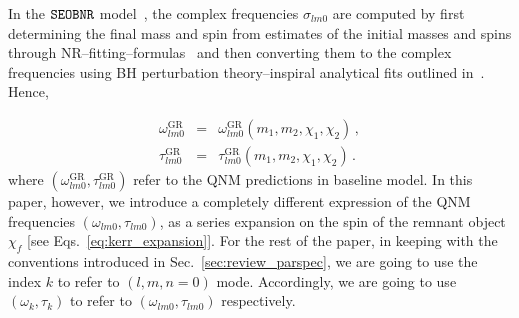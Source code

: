 In the $\texttt{SEOBNR}$ model~\cite{Mihaylov:2021bpf}, the complex frequencies $\sigma_{l m 0}$ are computed by first determining the final mass and spin from estimates of the initial masses and spins through NR--fitting--formulas~\cite{Taracchini:2013rva,Hofmann:2016yih} and then converting them to the complex frequencies using BH perturbation theory--inspiral analytical fits outlined in~\cite{Berti:2005ys,Berti:2009kk}. Hence,

\begin{subequations}
\begin{eqnarray}
\omega_{l m 0}^{\text{GR}} &=& \omega_{l m 0}^{\text{GR}}(m_1, m_2, \chi_1, \chi_2)\,,\\
\tau _{l m 0}^{\text{GR}} &=& \tau _{l m 0}^{\text{GR}}(m_1, m_2, \chi_1, \chi_2)\,.
\end{eqnarray}
\end{subequations}
where $(\omega_{l m 0}^{\text{GR}}, \tau _{l m 0}^{\text{GR}} )$ refer to the QNM predictions in baseline \SEOB{} model.  In this paper, however, we introduce a completely different expression of the QNM frequencies $(\omega_{l m 0}, \tau _{l m 0})$, as a series expansion on the spin of the remnant object $\chi_f$ [see Eqs.~\eqref{eq:kerr_expansion}].  For the rest of the paper, in keeping with the conventions introduced in Sec.~\ref{sec:review_parspec}, we are going to use the index $k$ to refer to $(l, m,n=0)$ mode. Accordingly, we are going to use $(\omega_k, \tau _k)$ to refer to $(\omega_{l m 0}, \tau _{l m 0})$ respectively.

